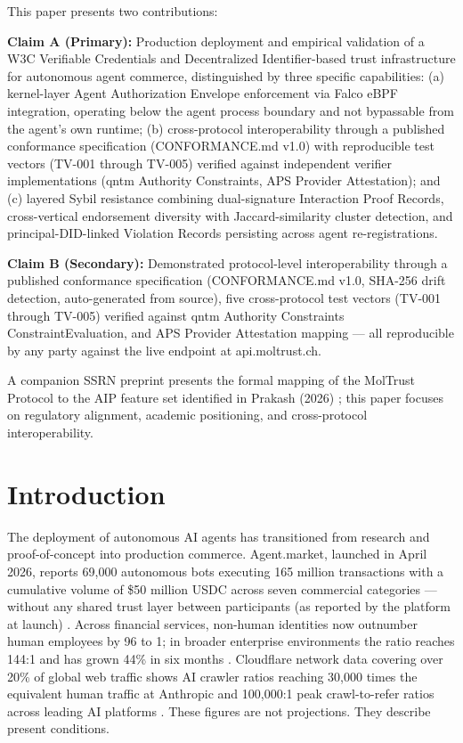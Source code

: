 This paper presents two contributions:


\textbf{Claim A (Primary):} Production deployment and empirical validation of a W3C Verifiable Credentials and Decentralized Identifier-based trust infrastructure for autonomous agent commerce, distinguished by three specific capabilities: (a) kernel-layer Agent Authorization Envelope enforcement via Falco eBPF integration, operating below the agent process boundary and not bypassable from the agent's own runtime; (b) cross-protocol interoperability through a published conformance specification (CONFORMANCE.md v1.0) with reproducible test vectors (TV-001 through TV-005) verified against independent verifier implementations (qntm Authority Constraints, APS Provider Attestation); and (c) layered Sybil resistance combining dual-signature Interaction Proof Records, cross-vertical endorsement diversity with Jaccard-similarity cluster detection, and principal-DID-linked Violation Records persisting across agent re-registrations.


\textbf{Claim B (Secondary):} Demonstrated protocol-level interoperability through a published conformance specification (CONFORMANCE.md v1.0, SHA-256 drift detection, auto-generated from source), five cross-protocol test vectors (TV-001 through TV-005) verified against qntm Authority Constraints ConstraintEvaluation, and APS Provider Attestation mapping — all reproducible by any party against the live endpoint at api.moltrust.ch.


A companion SSRN preprint presents the formal mapping of the MolTrust Protocol to the AIP feature set identified in Prakash (2026) \cite{ref27_kroehlssrn}; this paper focuses on regulatory alignment, academic positioning, and cross-protocol interoperability.



\section{Introduction}

The deployment of autonomous AI agents has transitioned from research and proof-of-concept into production commerce. Agent.market, launched in April 2026, reports 69,000 autonomous bots executing 165 million transactions with a cumulative volume of \$50 million USDC across seven commercial categories — without any shared trust layer between participants (as reported by the platform at launch) \cite{ref1_agentmarket}. Across financial services, non-human identities now outnumber human employees by 96 to 1; in broader enterprise environments the ratio reaches 144:1 and has grown 44\% in six months \cite{ref2_neville,ref3_entrolabs}. Cloudflare network data covering over 20\% of global web traffic shows AI crawler ratios reaching 30,000 times the equivalent human traffic at Anthropic and 100,000:1 peak crawl-to-refer ratios across leading AI platforms \cite{ref4_prince,ref5_cloudflare}. These figures are not projections. They describe present conditions.


